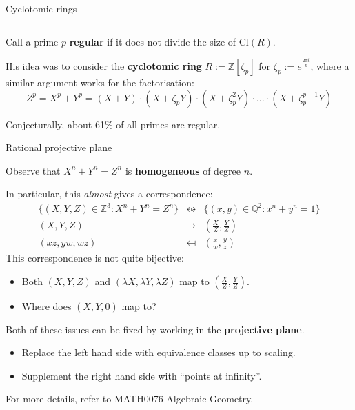 \documentclass[10pt]{beamer}
\theoremstyle{definition}
\begin{document}
\begin{frame}[t]{Cyclotomic rings}
\begin{columns}[T]
\end{columns}

\vspace{0.5cm} Call a prime $ p $ \textbf{regular} if it does not divide the size of $ \mathrm{Cl}(R) $.

\vspace{0.5cm} His idea was to consider the \textbf{cyclotomic ring} $ R := \mathbb{Z}[\zeta_p] $ for $ \zeta_p := e^{\frac{2\pi i}{p}} $, where a similar argument works for the factorisation:
$$ Z^p = X^p + Y^p = (X + Y) \cdot (X + \zeta_pY) \cdot (X + \zeta_p^2Y) \cdot \dots \cdot (X + \zeta_p^{p - 1}Y) $$

\vspace{0.5cm} Conjecturally, about 61\% of all primes are regular.

\end{frame}

\begin{frame}[t]{Rational projective plane}

Observe that $ X^n + Y^n = Z^n $ is \textbf{homogeneous} of degree $ n $.

\vspace{0.5cm} In particular, this \emph{almost} gives a correspondence:
$$
\begin{array}{rcl}
\{(X, Y, Z) \in \mathbb{Z}^3 : X^n + Y^n = Z^n\} & \leftrightsquigarrow & \{(x, y) \in \mathbb{Q}^2 : x^n + y^n = 1\} \\
(X, Y, Z) & \mapsto & (\tfrac{X}{Z}, \tfrac{Y}{Z}) \\
(xz, yw, wz) & \mapsfrom & (\tfrac{x}{w}, \tfrac{y}{z})
\end{array}
$$
This correspondence is not quite bijective:
\begin{itemize}
\item Both $ (X, Y, Z) $ and $ (\lambda X, \lambda Y, \lambda Z) $ map to $ (\tfrac{X}{Z}, \tfrac{Y}{Z}) $.
\item Where does $ (X, Y, 0) $ map to?
\end{itemize}
Both of these issues can be fixed by working in the \textbf{projective plane}.
\begin{itemize}
\item Replace the left hand side with equivalence classes up to scaling.
\item Supplement the right hand side with ``points at infinity''.
\end{itemize}

\vspace{0.5cm} For more details, refer to MATH0076 Algebraic Geometry.

\end{frame}
\end{document}
